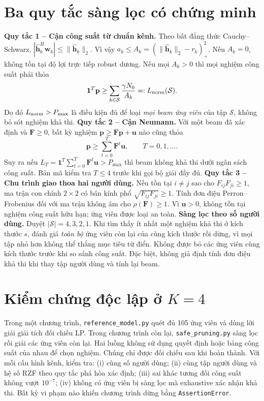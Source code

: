 \documentclass[12pt,onecolumn]{IEEEtran}
\begin{document}
\section{Ba quy tắc sàng lọc có chứng minh}
\textbf{Quy tắc 1 -- Cận công suất từ chuẩn kênh.} Theo bất đẳng thức Cauchy--Schwarz, $|\widehat{\mathbf h}_k^H\mathbf w_k|\le\|\widehat{\mathbf h}_k\|_2$. Vì vậy $a_k\le A_k=(\|\widehat{\mathbf h}_k\|_2-r_k)_+^2$. Nếu $A_k=0$, không tồn tại độ lợi trực tiếp robust dương. Nếu mọi $A_k>0$ thì mọi nghiệm công suất phải thỏa
\begin{equation}
 \mathbf1^T\mathbf p\ge \sum_{k\in\mathcal S}\frac{\gamma N_0}{A_k}=:L_{\rm norm}(\mathcal S).
\end{equation}
Do đó $L_{\rm norm}>P_{\max}$ là điều kiện đủ để loại \emph{mọi beam ứng viên} của tập $\mathcal S$, không bỏ sót nghiệm khả thi.
\textbf{Quy tắc 2 -- Cận Neumann.} Với một beam đã xác định và $\mathbf F\ge0$, bất kỳ nghiệm $\mathbf p\ge\mathbf F\mathbf p+\mathbf u$ nào cũng thỏa
\begin{equation}
 \mathbf p\ge\sum_{t=0}^{T}\mathbf F^t\mathbf u,\qquad T=0,1,\ldots.
\end{equation}
Suy ra nếu $L_T=\mathbf1^T\sum_{t=0}^T\mathbf F^t\mathbf u>P_{\max}$ thì beam không khả thi dưới ngân sách công suất. Bản mã kiểm tra $T\le4$ trước khi gọi bộ giải đầy đủ.
\textbf{Quy tắc 3 -- Chu trình giao thoa hai người dùng.} Nếu tồn tại $i\ne j$ sao cho $F_{ij}F_{ji}\ge1$, ma trận con chính $2\times2$ có bán kính phổ $\sqrt{F_{ij}F_{ji}}\ge1$. Tính đơn điệu Perron--Frobenius đối với ma trận không âm cho $\rho(\mathbf F)\ge1$. Vì $\mathbf u>0$, không tồn tại nghiệm công suất hữu hạn; ứng viên được loại an toàn.
\textbf{Sàng lọc theo số người dùng.} Duyệt $|\mathcal S|=4,3,2,1$. Khi tìm thấy ít nhất một nghiệm khả thi ở kích thước $s$, đánh giá \emph{toàn bộ} ứng viên còn lại của cùng kích thước rồi dừng, vì mọi tập nhỏ hơn không thể thắng mục tiêu từ điển. Không được bỏ các ứng viên cùng kích thước trước khi so sánh công suất. Đặc biệt, không giả định tính đơn điệu khả thi khi thay tập người dùng và tính lại beam.
\section{Kiểm chứng độc lập ở $K=4$}
Trong một chương trình, \texttt{reference\_model.py} quét đủ 105 ứng viên và dùng lời giải giải tích đối chiếu LP. Trong chương trình còn lại, \texttt{safe\_pruning.py} sàng lọc rồi giải các ứng viên còn lại. Hai luồng không sử dụng quyết định hoặc bảng công suất của nhau để chọn nghiệm. Chúng chỉ được đối chiếu sau khi hoàn thành.
Với mỗi cấu hình kênh, kiểm tra: (i) cùng số người dùng; (ii) cùng tập người dùng và hệ số RZF theo quy tắc phá hòa xác định; (iii) sai khác tương đối công suất không vượt $10^{-7}$; (iv) không có ứng viên bị sàng lọc mà exhaustive xác nhận khả thi. Bất kỳ vi phạm nào khiến chương trình dừng bằng \texttt{AssertionError}.
\end{document}
